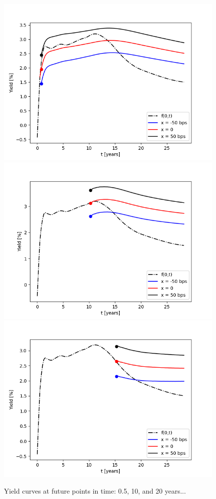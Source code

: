 \begin{figure}
\centering
\includegraphics[scale=0.5]{figures/yield_curves_0_5_years.png}
\includegraphics[scale=0.5]{figures/yield_curves_10_years.png}
\includegraphics[scale=0.5]{figures/yield_curves_15_years.png}
\caption{Yield curves at future points in time: 0.5, 10, and 20 years...}
\end{figure}


